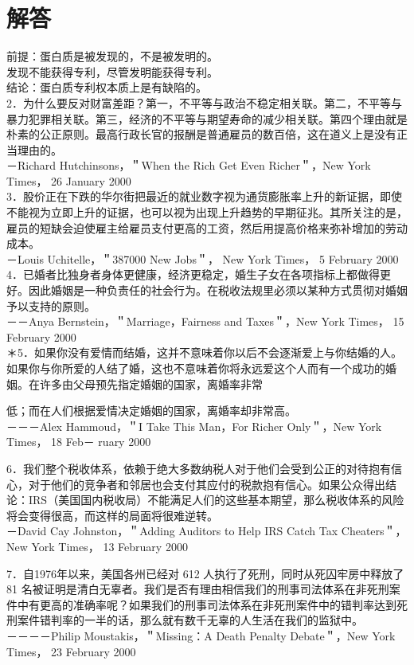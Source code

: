 \section*{解答}
前提：蛋白质是被发现的，不是被发明的。\\
发现不能获得专利，尽管发明能获得专利。\\
结论：蛋白质专利权本质上是有缺陷的。\\
2．为什么要反对财富差距？第一，不平等与政治不稳定相关联。第二，不平等与暴力犯罪相关联。第三，经济的不平等与期望寿命的减少相关联。第四个理由就是朴素的公正原则。最高行政长官的报酬是普通雇员的数百倍，这在道义上是没有正当理由的。\\
－Richard Hutchinsons，＂When the Rich Get Even Richer＂，New York Times， 26 January 2000\\
3．股价正在下跌的华尔街把最近的就业数字视为通货膨胀率上升的新证据，即使不能视为立即上升的证据，也可以视为出现上升趋势的早期征兆。其所关注的是，雇员的短缺会迫使雇主给雇员支付更高的工资，然后用提高价格来弥补增加的劳动成本。\\
－Louis Uchitelle，＂387000 New Jobs＂， New York Times， 5 February 2000\\
4．已婚者比独身者身体更健康，经济更稳定，婚生子女在各项指标上都做得更好。因此婚姻是一种负责任的社会行为。在税收法规里必须以某种方式贯彻对婚姻予以支持的原则。\\
－－Anya Bernstein，＂Marriage，Fairness and Taxes＂，New York Times， 15 February 2000\\
＊5．如果你没有爱情而结婚，这并不意味着你以后不会逐渐爱上与你结婚的人。如果你与你所爱的人结了婚，这也不意味着你将永远爱这个人而有一个成功的婚姻。在许多由父母预先指定婚姻的国家，离婚率非常

低；而在人们根据爱情决定婚姻的国家，离婚率却非常高。\\
－－－Alex Hammoud，＂I Take This Man，For Richer Only＂，New York Times， 18 Feb－ ruary 2000

6．我们整个税收体系，依赖于绝大多数纳税人对于他们会受到公正的对待抱有信心，对于他们的竞争者和邻居也会支付其应付的税款抱有信心。如果公众得出结论：IRS（美国国内税收局）不能满足人们的这些基本期望，那么税收体系的风险将会变得很高，而这样的局面将很难逆转。\\
－David Cay Johnston，＂Adding Auditors to Help IRS Catch Tax Cheaters＂，New York Times， 13 February 2000

7．自1976年以来，美国各州已经对 612 人执行了死刑，同时从死囚牢房中释放了 81 名被证明是清白无辜者。我们是否有理由相信我们的刑事司法体系在非死刑案件中有更高的准确率呢？如果我们的刑事司法体系在非死刑案件中的错判率达到死刑案件错判率的一半的话，那么就有数千无辜的人生活在我们的监狱中。\\
－－－－Philip Moustakis，＂Missing：A Death Penalty Debate＂，New York Times， 23 February 2000

